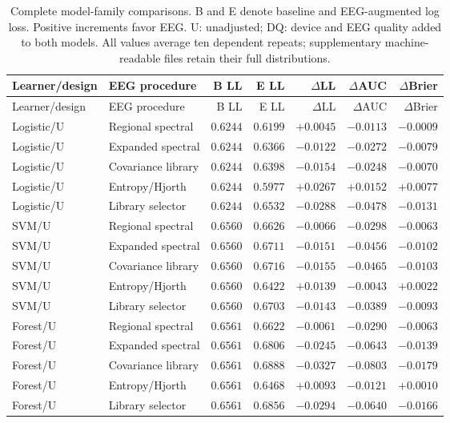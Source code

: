 \begin{longtable}{llrrrrr}
\caption{Complete model-family comparisons. B and E denote baseline and EEG-augmented log loss. Positive increments favor EEG. U: unadjusted; DQ: device and EEG quality added to both models. All values average ten dependent repeats; supplementary machine-readable files retain their full distributions.}\label{tab:model-extension}\\
\toprule Learner/design & EEG procedure & B LL & E LL & $\Delta$LL & $\Delta$AUC & $\Delta$Brier\\\midrule\endfirsthead
\toprule Learner/design & EEG procedure & B LL & E LL & $\Delta$LL & $\Delta$AUC & $\Delta$Brier\\\midrule\endhead
\bottomrule\endfoot
Logistic/U & Regional spectral & $0.6244$ & $0.6199$ & $+0.0045$ & $-0.0113$ & $-0.0009$\\
Logistic/U & Expanded spectral & $0.6244$ & $0.6366$ & $-0.0122$ & $-0.0272$ & $-0.0079$\\
Logistic/U & Covariance library & $0.6244$ & $0.6398$ & $-0.0154$ & $-0.0248$ & $-0.0070$\\
Logistic/U & Entropy/Hjorth & $0.6244$ & $0.5977$ & $+0.0267$ & $+0.0152$ & $+0.0077$\\
Logistic/U & Library selector & $0.6244$ & $0.6532$ & $-0.0288$ & $-0.0478$ & $-0.0131$\\
SVM/U & Regional spectral & $0.6560$ & $0.6626$ & $-0.0066$ & $-0.0298$ & $-0.0063$\\
SVM/U & Expanded spectral & $0.6560$ & $0.6711$ & $-0.0151$ & $-0.0456$ & $-0.0102$\\
SVM/U & Covariance library & $0.6560$ & $0.6716$ & $-0.0155$ & $-0.0465$ & $-0.0103$\\
SVM/U & Entropy/Hjorth & $0.6560$ & $0.6422$ & $+0.0139$ & $-0.0043$ & $+0.0022$\\
SVM/U & Library selector & $0.6560$ & $0.6703$ & $-0.0143$ & $-0.0389$ & $-0.0093$\\
Forest/U & Regional spectral & $0.6561$ & $0.6622$ & $-0.0061$ & $-0.0290$ & $-0.0063$\\
Forest/U & Expanded spectral & $0.6561$ & $0.6806$ & $-0.0245$ & $-0.0643$ & $-0.0139$\\
Forest/U & Covariance library & $0.6561$ & $0.6888$ & $-0.0327$ & $-0.0803$ & $-0.0179$\\
Forest/U & Entropy/Hjorth & $0.6561$ & $0.6468$ & $+0.0093$ & $-0.0121$ & $+0.0010$\\
Forest/U & Library selector & $0.6561$ & $0.6856$ & $-0.0294$ & $-0.0640$ & $-0.0166$\\

\end{longtable}
